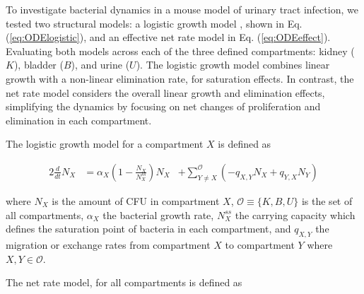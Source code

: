 \documentclass{article}
\begin{document}
To investigate bacterial dynamics in a mouse model of urinary tract infection, we tested two structural models: a logistic growth model \cite{allen2018bacterial}, shown in Eq. (\ref{eq:ODElogistic}), and an effective net rate model in Eq. (\ref{eq:ODEeffect}). Evaluating both models across each of the three defined compartments: kidney ($K$), bladder ($B$), and urine ($U$). The logistic growth model combines linear growth with a non-linear elimination rate, for saturation effects. In contrast, the net rate model considers the overall linear growth and elimination effects, simplifying the dynamics by focusing on net changes of proliferation and elimination in each compartment.

The logistic growth model for a compartment $X$ is defined as


\begin{alignat}{2}
\frac{d}{dt} N_{X} &=  \alpha_X \left( 1 - \frac{ N_{X} }{ N_{X}^{ss} }\right)N_{X}  & + \sum_{Y \neq X}^{\mathcal{O} } \left( -q_{X,Y} N_{X} + q_{Y, X} N_{Y} \right)
\label{eq:ODElogistic}
\end{alignat}



where $N_{X}$ is the amount of CFU in compartment $X$, $\mathcal{O} \equiv \{K,B,U\}$ is the set of all compartments, $\alpha_{X}$ the bacterial growth rate, $N^{ss}_{X}$ the carrying capacity which defines the saturation point of bacteria in each compartment, and $q_{X,Y}$ the migration or exchange rates from compartment $X$ to compartment $Y$ where $X,Y \in \mathcal{O}$.

The net rate model,  for all compartments is defined as
\end{document}
